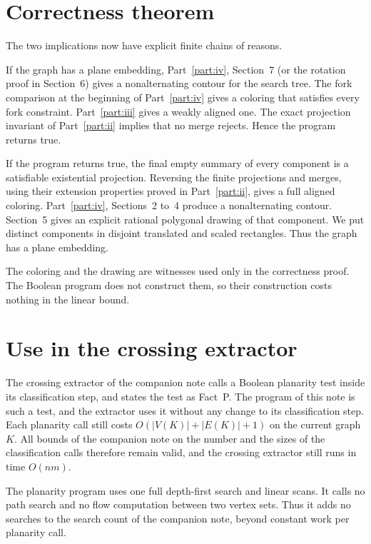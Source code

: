 \documentclass[11pt]{article}
\begin{document}
\section{Correctness theorem}

The two implications now have explicit finite chains of reasons.

If the graph has a plane embedding, Part~\ref{part:iv}, Section~7 (or the
rotation proof in Section~6) gives a nonalternating contour for the search
tree. The fork comparison at the beginning of Part~\ref{part:iv} gives a
coloring that satisfies every fork constraint. Part~\ref{part:iii} gives a
weakly aligned one. The exact projection invariant of Part~\ref{part:ii}
implies that no merge rejects. Hence the program returns true.

If the program returns true, the final empty summary of every component is a
satisfiable existential projection. Reversing the finite projections and
merges, using their extension properties proved in Part~\ref{part:ii}, gives a
full aligned coloring. Part~\ref{part:iv}, Sections~2 to~4 produce a
nonalternating contour. Section~5 gives an explicit rational polygonal drawing
of that component. We put distinct components in disjoint translated and scaled
rectangles. Thus the graph has a plane embedding.

The coloring and the drawing are witnesses used only in the correctness proof.
The Boolean program does not construct them, so their construction costs
nothing in the linear bound.

\section{Use in the crossing extractor}

The crossing extractor of the companion note \cite{HJ26} calls a Boolean
planarity test inside its classification step, and states the test as Fact~P.
The program of this note is such a test, and the extractor uses it without any
change to its classification step. Each planarity call still costs
$O(|V(K)|+|E(K)|+1)$ on the current graph $K$. All bounds of the companion
note on the number and the sizes of the classification calls therefore remain
valid, and the crossing extractor still runs in time $O(nm)$.

The planarity program uses one full depth-first search and linear scans. It
calls no path search and no flow computation between two vertex sets. Thus it
adds no searches to the search count of the companion note, beyond constant
work per planarity call.
\end{document}
